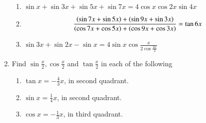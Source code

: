 \begin{enumerate}[label=\thesubsection.\arabic*,ref=\thesubsection.\theenumi,itemsep=1ex]
\begin{enumerate}
\item $\sin x+\sin3x+\sin5x+\sin7x=4\cos x\cos2x\sin4x$
\item $$\frac{\left(\sin7x+\sin5x\right)+\left(\sin9x+\sin3x\right)}{\left(\cos7x+\cos5x\right)+\left(\cos9x+\cos3x\right)}=\tan6x$$
\item $\sin3x+\sin2x-\sin x=4\sin x\cos\frac{x}{2\cos\frac{3x}{2}}$
\end{enumerate}
%
\item Find $\sin\frac{x}{2},\cos\frac{x}{2}$ and $\tan\frac{x}{2}$ in each of the following
\begin{enumerate}
\item $\tan x=-\frac{4}{3}x$,  in second quadrant. 
\item $\sin x=\frac{1}{4}x$,   in second quadrant.
\item $\cos x=-\frac{1}{3}x$,  in third quadrant.
\end{enumerate}
    
\end{enumerate}
    
